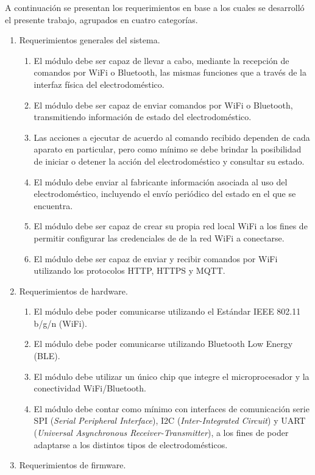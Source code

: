 A continuación se presentan los requerimientos en base a los cuales se desarrolló el presente trabajo, agrupados en cuatro categorías.
\begin{enumerate}
	\item Requerimientos generales del sistema.
	\begin{enumerate}
		\item El módulo debe ser capaz de llevar a cabo, mediante la recepción de comandos por
WiFi o Bluetooth, las mismas funciones que a través de la interfaz física del
electrodoméstico.
		\item El módulo debe ser capaz de enviar comandos por WiFi o Bluetooth, transmitiendo información de estado del electrodoméstico.
		\item Las acciones a ejecutar de acuerdo al comando recibido dependen de cada
aparato en particular, pero como mínimo se debe brindar la posibilidad de iniciar o
detener la acción del electrodoméstico y consultar su estado.
		\item El módulo debe enviar al fabricante información asociada al uso del
electrodoméstico, incluyendo el envío periódico del estado en el que se encuentra.
		\item El módulo debe ser capaz de crear su propia red local WiFi a los fines de
permitir configurar las credenciales de de la red WiFi a conectarse.
		\item El módulo debe ser capaz de enviar y recibir comandos por WiFi utilizando los
protocolos HTTP, HTTPS y MQTT.
	\end{enumerate}
	\item Requerimientos de hardware.
	\begin{enumerate}
		\item El módulo debe poder comunicarse utilizando el Estándar IEEE 802.11 b/g/n
(WiFi).
		\item El módulo debe poder comunicarse utilizando Bluetooth Low Energy (BLE).
		\item El módulo debe utilizar un único chip que integre el microprocesador y la conectividad WiFi/Bluetooth.
		\item El módulo debe contar como mínimo con interfaces de comunicación serie SPI (\emph{Serial Peripheral Interface}), I2C (\emph{Inter-Integrated Circuit}) y UART (\emph{Universal Asynchronous Receiver-Transmitter}), a los fines de poder adaptarse a los distintos tipos de electrodomésticos.
	\end{enumerate}
	\item Requerimientos de firmware.

\end{enumerate}
